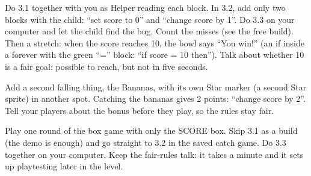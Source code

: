 \begin{differentiation}
\supportpath Do 3.1 together with you as Helper reading each block. In 3.2, add only two blocks with the child: \enquote{set score to 0} and \enquote{change score by 1}. Do 3.3 on your computer and let the child find the bug.
\extensionpath Count the misses (see the free build). Then a stretch: when the score reaches 10, the bowl says \enquote{You win!} (an if inside a forever with the green  \enquote{=} block: \enquote{if score = 10 then}). Talk about whether 10 is a fair goal: possible to reach, but not in five seconds.
\end{differentiation}

\begin{stretchchallenge}
Add a second falling thing, the Bananas, with its own Star marker (a second Star sprite) in another spot. Catching the bananas gives 2 points: \enquote{change score by 2}. Tell your players about the bonus before they play, so the rules stay fair.
\end{stretchchallenge}

\begin{teachernote}
Play one round of the box game with only the SCORE box. Skip 3.1 as a build (the demo is enough) and go straight to 3.2 in the saved catch game. Do 3.3 together on your computer. Keep the fair-rules talk: it takes a minute and it sets up playtesting later in the level.
\end{teachernote}
